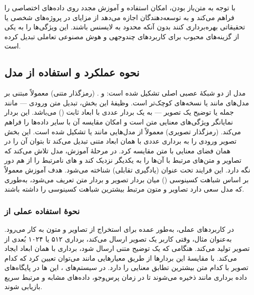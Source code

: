 \documentclass{article}
\begin{document}
با توجه به متن‌باز بودن،  امکان استفاده و آموزش مجدد روی داده‌های اختصاصی را فراهم می‌کند و به توسعه‌دهندگان اجازه می‌دهد از مزایای  در پروژه‌های شخصی یا تحقیقاتی بهره‌برداری کنند بدون آنکه محدود به لایسنس  باشند.
این ویژگی‌ها  را به یکی از گزینه‌های محبوب برای کاربردهای چندوجهی و هوش مصنوعی تعاملی تبدیل کرده است.
\subsection{نحوه عملکرد و استفاده از مدل }
مدل  از دو شبکهٔ عصبی اصلی تشکیل شده است:  و .
 (رمزگذار متنی) معمولاً مبتنی بر مدل‌های  مانند  یا نسخه‌های کوچک‌تر  است.
وظیفهٔ این بخش، تبدیل متن ورودی — مانند جمله یا توضیح یک تصویر — به یک بردار عددی با ابعاد ثابت () می‌باشد.
این بردار نمایانگر ویژگی‌های معنایی متن است و امکان مقایسه آن با سایر داده‌ها را فراهم می‌کند.
 (رمزگذار تصویری) معمولاً از مدل‌هایی مانند  یا  تشکیل شده است.
این بخش تصویر ورودی را به برداری عددی با همان ابعاد  متنی تبدیل می‌کند تا بتوان آن را در همان فضای معنایی با متن مقایسه کرد.
در مرحلهٔ آموزش، مدل تلاش می‌کند که  تصاویر و متن‌های مرتبط با آن‌ها را به یکدیگر نزدیک کند و ‌های نامرتبط را از هم دور نگه دارد.
این فرایند تحت عنوان  (یادگیری تقابلی) شناخته می‌شود.
هدف آموزش معمولاً بر اساس شباهت کسینوسی () میان بردار تصویر و بردار متن تعریف می‌شود، به‌طوری که مدل سعی دارد تصاویر و متون مرتبط بیشترین شباهت کسینوسی را داشته باشند.

\subsubsection{نحوهٔ استفاده عملی از }
در کاربردهای عملی،  به‌طور عمده برای استخراج  از تصاویر و متون به کار می‌رود.
به‌عنوان مثال، وقتی کاربر یک تصویر ارسال می‌کند،  برداری ۵۱۲ یا ۱۰۲۴ بُعدی از تصویر تولید می‌کند.
هنگامی که یک توضیح متنی ارسال شود،  برداری با همان ابعاد ایجاد می‌کند.
با مقایسهٔ این بردارها از طریق معیارهایی مانند  می‌توان تعیین کرد که کدام تصویر با کدام متن بیشترین تطابق معنایی را دارد.
در سیستم‌های ، این ها در پایگاه‌های داده برداری مانند  ذخیره می‌شوند تا در زمان پرس‌وجو، داده‌های مشابه و مرتبط سریع بازیابی شوند.
\end{document}
